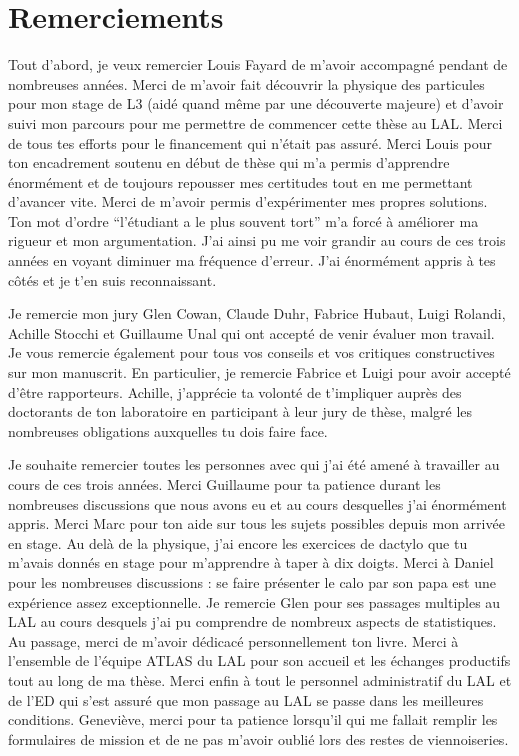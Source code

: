 \chapter*{Remerciements}

Tout d'abord, je veux remercier Louis Fayard de m'avoir accompagné pendant de nombreuses années.
Merci de m'avoir fait découvrir la physique des particules pour mon stage de L3 (aidé quand même par une découverte majeure) et d'avoir suivi mon parcours pour me  permettre de commencer cette thèse au LAL.
Merci de tous tes efforts pour le financement qui n'était pas assuré.
Merci Louis pour ton encadrement soutenu en début de thèse qui m'a permis d'apprendre énormément et de toujours repousser mes certitudes tout en me permettant d'avancer vite.
Merci de m'avoir permis d'expérimenter mes propres solutions.
Ton mot d'ordre ``l'étudiant a le plus souvent tort'' m'a forcé à améliorer ma rigueur et mon argumentation.
J'ai ainsi pu me voir grandir au cours de ces trois années en voyant diminuer ma fréquence d'erreur.
J'ai énormément appris à tes côtés et je t'en suis reconnaissant.

Je remercie mon jury Glen Cowan, Claude Duhr, Fabrice Hubaut, Luigi Rolandi, Achille Stocchi et Guillaume Unal qui ont accepté de venir évaluer mon travail.
Je vous remercie également pour tous vos conseils et vos critiques constructives sur mon manuscrit.
En particulier, je remercie Fabrice et Luigi pour avoir accepté d'être rapporteurs.
Achille, j'apprécie ta volonté de t'impliquer auprès des doctorants de ton laboratoire en participant à leur jury de thèse, malgré les nombreuses obligations auxquelles tu dois faire face.


Je souhaite remercier toutes les personnes avec qui j'ai été amené à travailler au cours de ces trois années.
Merci Guillaume pour ta patience durant les nombreuses discussions que nous avons eu et au cours desquelles j'ai énormément appris.
Merci Marc pour ton aide sur tous les sujets possibles depuis mon arrivée en stage.
Au delà de la physique, j'ai encore les exercices de dactylo que tu m'avais donnés en stage pour m'apprendre à taper à dix doigts.
Merci à Daniel pour les nombreuses discussions : se faire présenter le calo par son papa est une expérience assez exceptionnelle.
Je remercie Glen pour ses passages multiples au LAL au cours desquels j'ai pu comprendre de nombreux aspects de statistiques.
Au passage, merci de m'avoir dédicacé personnellement  ton livre.
Merci à l'ensemble de l'équipe ATLAS du LAL pour son accueil et les échanges productifs tout au long de ma thèse.
Merci enfin à tout le personnel administratif du LAL et de l'ED qui s'est assuré que mon passage au LAL se passe dans les meilleures conditions.
Geneviève, merci pour ta patience lorsqu'il qui me fallait remplir les formulaires de mission et de ne pas m'avoir oublié lors des restes de viennoiseries.

